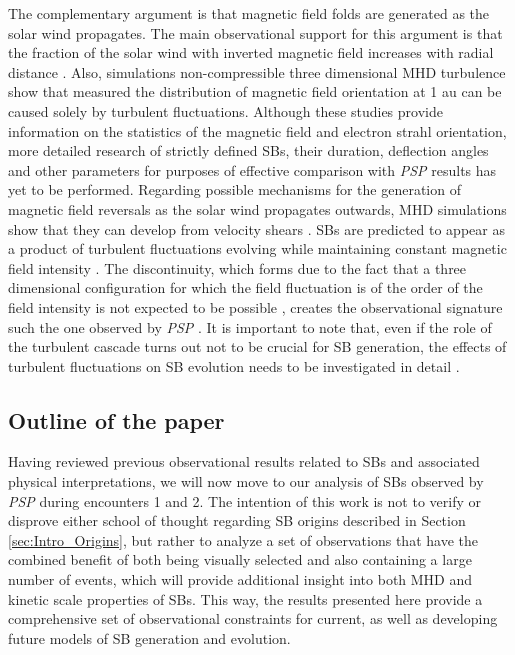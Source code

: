 \documentclass[]{aastex62}
\begin{document}
The complementary argument is that magnetic field folds are generated as the solar wind propagates. The main observational support for this argument is that the fraction of the solar wind with inverted magnetic field increases with radial distance \citep{Forsyth_1995_GRL,McComas_1998_GRL,Borovsky_2016_JGRA,Owens_2018_ApJ,Macneil_2020_MNRAS,Badman_2020_arXiv}. Also, simulations non-compressible three dimensional MHD turbulence \citep{Zhdankin_2012_ApJ} show that measured the distribution of magnetic field orientation at 1 au can be caused solely by turbulent fluctuations. Although these studies provide information on the statistics of the magnetic field and electron strahl orientation, more detailed research of strictly defined SBs, their duration, deflection angles and other parameters for purposes of effective comparison with \emph{PSP} results has yet to be performed. Regarding possible mechanisms for the generation of magnetic field reversals as the solar wind propagates outwards, MHD simulations show that they can develop from velocity shears \citep{Landi_2006_GeoRL,Ruffolo_2020_ApJ}. SBs are predicted to appear as a product of turbulent fluctuations evolving while maintaining constant magnetic field intensity \citep{Vasquez_1996_JGR}. The discontinuity, which forms due to the fact that a three dimensional configuration for which the field fluctuation is of the order of the field intensity is not expected to be possible \citep{Barnes_1976_JGR,Valentini_2019_ApJ}, creates the observational signature such the one observed by \emph{PSP} \citep{Squire_2020_ApJL}. It is important to note that, even if the role of the turbulent cascade turns out not to be crucial for SB generation, the effects of turbulent fluctuations on SB evolution needs to be investigated in detail \citep{Chen_2020_ApJS}.


\subsection{Outline of the paper}
\label{sec:Intro_Outline}

Having reviewed previous observational results related to SBs and associated physical interpretations, we will now move to our analysis of SBs observed by \emph{PSP} during encounters 1 and 2. The intention of this work is not to verify or disprove either school of thought regarding SB origins described in Section \ref{sec:Intro_Origins}, but rather to analyze a set of observations that have the combined benefit of both being visually selected and also containing a large number of events, which will provide additional insight into both MHD and kinetic scale properties of SBs. This way, the results presented here provide a comprehensive set of  observational constraints for current, as well as developing future models of SB generation and evolution.
\end{document}
